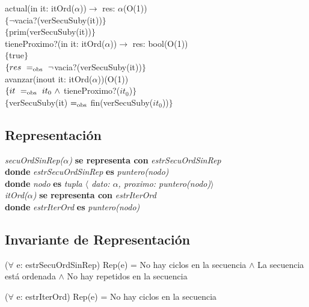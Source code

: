 actual(in it: itOrd($\alpha$))$\longrightarrow$ res: $\alpha$\hfill (O(1))\\
$\{\neg$vacia?(verSecuSuby(it))$\}$\\
$\{$prim(verSecuSuby(it))$\}$\\

tieneProximo?(in it: itOrd($\alpha$))$\longrightarrow$ res: bool\hfill (O(1))\\
$\{$true$\}$\\
$\{\sombreritoWide{res}\ \igobs\ \neg$vacia?(verSecuSuby(it))$\}$\\

avanzar(inout it: itOrd($\alpha$))\hfill (O(1))\\
$\{\sombreritoWide{it}\ \igobs\ it_0\ \wedge$ tieneProximo?($it_0$)$\}$\\
$\{$verSecuSuby(it) $=_{\mathrm{obs}}$ fin(verSecuSuby($it_0$))$\}$\\


\subsection*{Representaci\'on}
\textit{secuOrdSinRep($\alpha$)} \textbf{se representa con} \textit{estrSecuOrdSinRep}\\
\textbf{donde} \textit{estrSecuOrdSinRep} \textbf{es} \textit{puntero(nodo)}\\
\textbf{donde} \textit{nodo} \textbf{es} \textit{tupla $\langle$ dato: $\alpha$, proximo: puntero(nodo)$\rangle$}\\

\textit{itOrd($\alpha$)} \textbf{se representa con} \textit{estrIterOrd}\\
\textbf{donde} \textit{estrIterOrd} \textbf{es} \textit{puntero(nodo)}\\

\subsection*{Invariante de Representaci\'on}
\vspace{11pt}
($\forall$ e: estrSecuOrdSinRep) Rep(e) = No hay ciclos en la secuencia $\wedge$ La secuencia est\'a ordenada $\wedge$ No hay repetidos en la secuencia

\vspace{22pt}

\vspace{11pt}
($\forall$ e: estrIterOrd) Rep(e) = No hay ciclos en la secuencia

